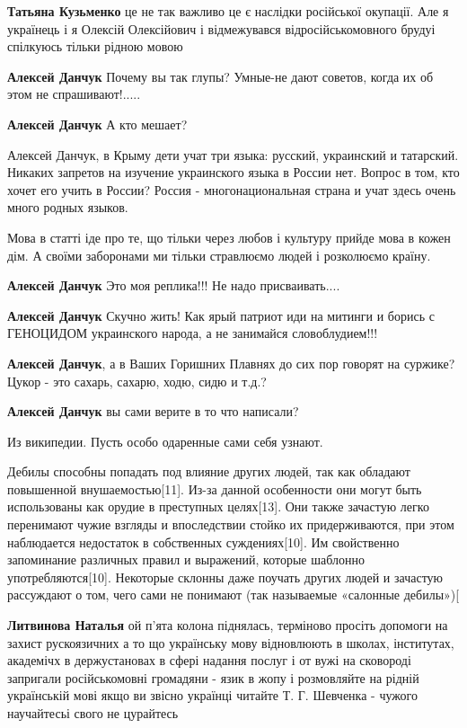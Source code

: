 \begin{itemize}
\textbf{Татьяна Кузьменко} це не так важливо це є наслідки російської окупації.
Але я українець і я Олексій Олексійович і відмежувався відросійськомовного
брудуі спілкуюсь тільки рідною мовою

\textbf{Алексей Данчук} Почему вы так глупы? Умные-не дают советов, когда их об этом не спрашивают!.....

\textbf{Алексей Данчук} А кто мешает?


Алексей Данчук, в Крыму дети учат три языка: русский, украинский и татарский.
Никаких запретов на изучение украинского языка в России нет. Вопрос в том, кто
хочет его учить в России? Россия - многонациональная страна и учат здесь очень
много родных языков.

Мова в статті іде про те, що тільки через любов і культуру прийде мова в кожен
дім. А своїми заборонами ми тільки стравлюємо людей і розколюємо країну.

\textbf{Алексей Данчук} Это моя реплика!!! Не надо присваивать....

\textbf{Алексей Данчук} Скучно жить! Как ярый патриот иди на митинги и борись с
ГЕНОЦИДОМ украинского народа, а не занимайся словоблудием!!!

\textbf{Алексей Данчук}, а в Ваших Горишних Плавнях до сих пор говорят на
суржике? Цукор - это сахарь, сахарю, ходю, сидю и т.д.?


\textbf{Алексей Данчук} вы сами верите в то что написали?

Из википедии. Пусть особо одаренные сами себя узнают.

Дебилы способны попадать под влияние других людей, так как обладают повышенной
внушаемостью[11]. Из-за данной особенности они могут быть использованы как
орудие в преступных целях[13]. Они также зачастую легко перенимают чужие
взгляды и впоследствии стойко их придерживаются, при этом наблюдается
недостаток в собственных суждениях[10]. Им свойственно запоминание различных
правил и выражений, которые шаблонно употребляются[10]. Некоторые склонны даже
поучать других людей и зачастую рассуждают о том, чего сами не понимают (так
называемые «салонные дебилы»)[

\textbf{Литвинова Наталья} ой п'ята колона піднялась, терміново просіть
допомоги на захист рускоязичних а то що українську мову відновлюють в школах,
інститутах, академічх в держустановах в сфері надання послуг і от вужі на
сковороді запригали російськомовні громадяни - язик в жопу і розмовляйте на
рідній українській мові якщо ви звісно українці читайте Т. Г. Шевченка - чужого
научайтесьі свого не цурайтесь

\end{itemize}

